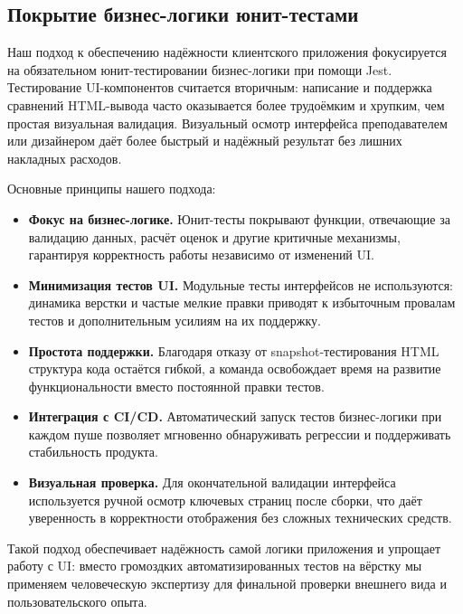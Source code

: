 \subsection{Покрытие бизнес-логики юнит-тестами}

Наш подход к обеспечению надёжности клиентского приложения фокусируется на обязательном юнит-тестировании бизнес-логики при помощи Jest. Тестирование UI-компонентов считается вторичным: написание и поддержка сравнений HTML-вывода часто оказывается более трудоёмким и хрупким, чем простая визуальная валидация. Визуальный осмотр интерфейса преподавателем или дизайнером даёт более быстрый и надёжный результат без лишних накладных расходов.

Основные принципы нашего подхода:
\begin{itemize}
  \item \textbf{Фокус на бизнес-логике.} Юнит-тесты покрывают функции, отвечающие за валидацию данных, расчёт оценок и другие критичные механизмы, гарантируя корректность работы независимо от изменений UI.
  \item \textbf{Минимизация тестов UI.} Модульные тесты интерфейсов не используются: динамика верстки и частые мелкие правки приводят к избыточным провалам тестов и дополнительным усилиям на их поддержку.
  \item \textbf{Простота поддержки.} Благодаря отказу от snapshot-тестирования HTML структура кода остаётся гибкой, а команда освобождает время на развитие функциональности вместо постоянной правки тестов.
  \item \textbf{Интеграция с CI/CD.} Автоматический запуск тестов бизнес-логики при каждом пуше позволяет мгновенно обнаруживать регрессии и поддерживать стабильность продукта.
  \item \textbf{Визуальная проверка.} Для окончательной валидации интерфейса используется ручной осмотр ключевых страниц после сборки, что даёт уверенность в корректности отображения без сложных технических средств.
\end{itemize}

Такой подход обеспечивает надёжность самой логики приложения и упрощает работу с UI: вместо громоздких автоматизированных тестов на вёрстку мы применяем человеческую экспертизу для финальной проверки внешнего вида и пользовательского опыта.

